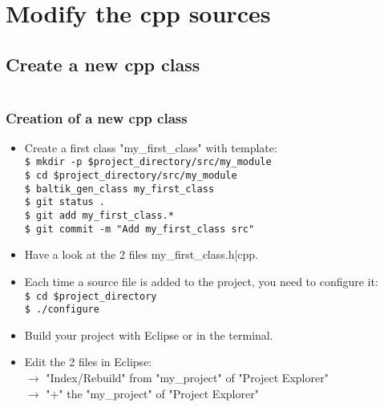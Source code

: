 \documentclass[10pt, hyperref={unicode=true,pdfusetitle, bookmarks=true,bookmarksnumbered=false,bookmarksopen=false, breaklinks=false,pdfborder={0 0 1},backref=true,colorlinks=true,linkcolor=darkblue,pageanchor, urlcolor=darkblue}]{beamer}
\begin{document}
\section{{\bf{Modify the cpp sources}}}
\subsection{{\bf{Create a new cpp class}}}
\begin{frame}
\begin{columns}[c] 
\tableofcontents[sections={1-3},currentsection, currentsubsection]
\tableofcontents[sections={4-8},currentsection, currentsubsection]
\end{columns}
\end{frame}
\begin{frame}
\frametitle{Creation of a new cpp class}
\begin{block}{}
\begin{itemize}
\item Create a first class "my\_first\_class" with template:\\
\texttt{\$ mkdir -p \$project\_directory/src/my\_module}\\
\texttt{\$ cd \$project\_directory/src/my\_module}\\
\texttt{\$ baltik\_gen\_class my\_first\_class}\\
\texttt{\$ git status .}\\
\texttt{\$ git add my\_first\_class.*}\\
\texttt{\$ git commit -m "Add my\_first\_class src"}\\

\item Have a look at the 2 files my\_first\_class.h|cpp.\\

\item Each time a source file is added to the project, you need to configure it:\\
\texttt{\$ cd \$project\_directory}\\
\texttt{\$ ./configure}\\

\item Build your project with Eclipse or in the terminal.\\

\item Edit the 2 files in Eclipse:\\
$\rightarrow$ "Index/Rebuild" from "my\_project" of "Project Explorer"\\
$\rightarrow$ "+" the "my\_project" of "Project Explorer"\\
\end{itemize}
\end{block}
\end{frame}
\end{document}
